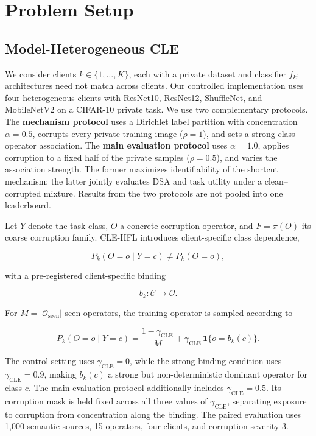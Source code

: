 \section{Problem Setup}

\subsection{Model-Heterogeneous CLE}

We consider clients \(k\in\{1,\ldots,K\}\), each with a private dataset and classifier \(f_k\); architectures need not match across clients. Our controlled implementation uses four heterogeneous clients with ResNet10, ResNet12, ShuffleNet, and MobileNetV2 on a CIFAR-10 private task. We use two complementary protocols. The \textbf{mechanism protocol} uses a Dirichlet label partition with concentration \(\alpha=0.5\), corrupts every private training image (\(\rho=1\)), and sets a strong class--operator association. The \textbf{main evaluation protocol} uses \(\alpha=1.0\), applies corruption to a fixed half of the private samples (\(\rho=0.5\)), and varies the association strength. The former maximizes identifiability of the shortcut mechanism; the latter jointly evaluates DSA and task utility under a clean--corrupted mixture. Results from the two protocols are not pooled into one leaderboard.

Let \(Y\) denote the task class, \(O\) a concrete corruption operator, and \(F=\pi(O)\) its coarse corruption family. CLE-HFL introduces client-specific class dependence,

\[
P_k(O=o\mid Y=c)\neq P_k(O=o),
\]

with a pre-registered client-specific binding

\[
b_k:\mathcal C\rightarrow\mathcal O.
\]

For \(M=|\mathcal O_{\mathrm{seen}}|\) seen operators, the training operator is sampled according to

\[
P_k(O=o\mid Y=c)
=\frac{1-\gamma_{\mathrm{CLE}}}{M}
+\gamma_{\mathrm{CLE}}\,\mathbf 1\{o=b_k(c)\}.
\]

The control setting uses \(\gamma_{\mathrm{CLE}}=0\), while the strong-binding condition uses \(\gamma_{\mathrm{CLE}}=0.9\), making \(b_k(c)\) a strong but non-deterministic dominant operator for class \(c\). The main evaluation protocol additionally includes \(\gamma_{\mathrm{CLE}}=0.5\). Its corruption mask is held fixed across all three values of \(\gamma_{\mathrm{CLE}}\), separating exposure to corruption from concentration along the binding. The paired evaluation uses 1,000 semantic sources, 15 operators, four clients, and corruption severity 3.


